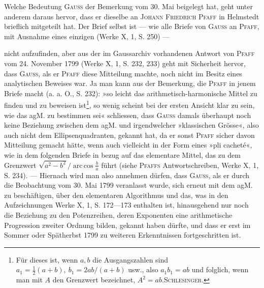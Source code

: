 Welche Bedeutung \textsc{Gauss} der Bemerkung vom 30. Mai beigelegt hat,
geht unter anderem daraus hervor, dass er dieselbe an \textsc{Johann Friedrich Pfaff}
in Helmstedt brieflich mitgeteilt hat. Der Brief selbst ist — wie alle Briefe
von \textsc{Gauss} an \textsc{Pfaff}, mit Ausnahme eines einzigen (Werke X, 1, S. 250) —\par
\clearpage{}
\noindent nicht aufzufinden, aber aus der im Gaussarchiv vorhandenen Antwort von
\textsc{Pfaff} vom 24. November 1799 (Werke X, 1, S. 232, 233) geht mit Sicherheit
hervor, dass \textsc{Gauss}, als er \textsc{Pfaff} diese Mitteilung machte, noch nicht im Besitz
eines analytischen Beweises war. Ja man kann aus der Bemerkung, die
\textsc{Pfaff} in jenem Briefe macht (a. a. O., S. 232): »so leicht das arithmetisch-harmonische
Mittel zu finden und zu beweisen ist\footnote{Für dieses ist, wenn \(a,b\) die Ausgangszahlen sind \(a_1=\frac12(a+b),\ b_1=2ab/(a+b)\) usw., also
\(a_1b_1=ab\) und folglich, wenn man mit \(A\) den Grenzwert bezeichnet, \(A^2=ab\).\hfill\textsc{Schlesinger}.}, so wenig scheint bei
der ersten Ansicht klar zu sein, wie das agM. zu bestimmen sei« schliessen,
dass \textsc{Gauss} damals überhaupt noch keine Beziehung zwischen dem agM. und
irgendwelcher »klassischen Grösse«, also auch nicht dem Ellipsenquadranten,
gekannt hat, da er sonst \textsc{Pfaff} sicher davon Mitteilung gemacht hätte, wenn
auch vielleicht in der Form eines »pli cacheté«, wie in dem folgenden Briefe
in bezug auf das elementare Mittel, das zu dem Grenzwert \(\sqrt{a^2-b^2}/\operatorname{arc\,cos}\frac ba\)
führt (siehe \textsc{Pfaffs} Antwortschreiben, Werke X, 1, S. 234). — Hiernach wird
man also annehmen dürfen, dass \textsc{Gauss}, als er durch die Beobachtung vom
30. Mai 1799 veranlasst wurde, sich erneut mit dem agM. zu beschäftigen,
über den elementaren Algorithmus und das, was in den Aufzeichnungen
Werke X, 1, S. 172—173 enthalten ist, hinausgehend nur noch die Beziehung
zu den Potenzreihen, deren Exponenten eine arithmetische Progression zweiter
Ordnung bilden, gekannt haben dürfte, und dass er erst im Sommer oder
Spätherbst 1799 zu weiteren Erkenntnissen fortgeschritten ist.
